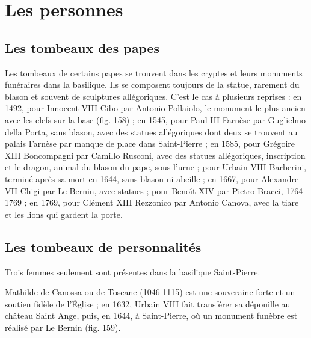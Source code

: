 \documentclass[12pt,twoside,openany]{book}
\begin{document}
\section{Les personnes}

\subsection{Les tombeaux des papes}

Les tombeaux de certains papes se trouvent dans les cryptes et leurs monuments funéraires dans la basilique. Ils se composent toujours de la statue, rarement du blason et souvent de sculptures allégoriques. C’est le cas à plusieurs reprises : en 1492, pour Innocent VIII Cibo par Antonio Pollaiolo, le monument le plus ancien avec les clefs sur la base (fig. 158) ; en 1545, pour Paul III Farnèse par Guglielmo della Porta, sans blason, avec des statues allégoriques dont deux se trouvent au palais Farnèse par manque de place dans Saint-Pierre ; en 1585, pour Grégoire XIII Boncompagni par Camillo Rusconi, avec des statues allégoriques, inscription et le dragon, animal du blason du pape, sous l’urne ; pour Urbain VIII Barberini, terminé après sa mort en 1644, sans blason ni abeille ; en 1667, pour Alexandre VII Chigi par Le Bernin, avec statues ; pour Benoît XIV par Pietro Bracci, 1764-1769 ; en 1769, pour Clément XIII Rezzonico par Antonio Canova, avec la tiare et les lions qui gardent la porte.

\subsection{Les tombeaux de personnalités}

Trois femmes seulement sont présentes dans la basilique Saint-Pierre.

Mathilde de Canossa ou de Toscane (1046-1115) est une souveraine forte et un soutien fidèle de l’Église ; en 1632, Urbain VIII fait transférer sa dépouille au château Saint Ange, puis, en 1644, à Saint-Pierre, où un monument funèbre est réalisé par Le Bernin (fig. 159).
\end{document}
